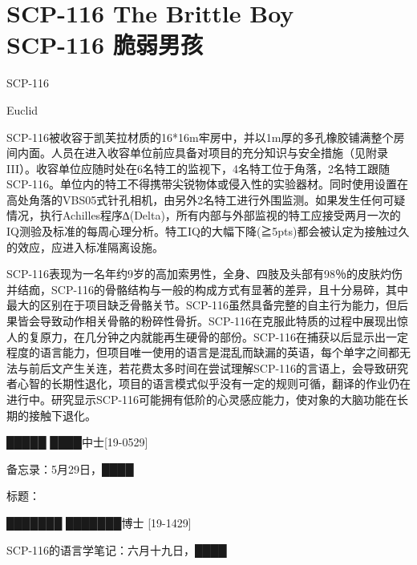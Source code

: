 \chapter[SCP-116 脆弱男孩]{
    SCP-116 The Brittle Boy\\
    SCP-116 脆弱男孩
}

\label{chap:SCP-116}

SCP-116

Euclid

SCP-116被收容于凯芙拉材质的16*16m牢房中，并以1m厚的多孔橡胶铺满整个房间内面。人员在进入收容单位前应具备对项目的充分知识与安全措施（见附录III）。收容单位应随时处在6名特工的监视下，4名特工位于角落，2名特工跟随SCP-116。单位内的特工不得携带尖锐物体或侵入性的实验器材。同时使用设置在高处角落的VBS05式针孔相机，由另外2名特工进行外围监测。如果发生任何可疑情况，执行Achilles程序∆(Delta)，所有内部与外部监视的特工应接受两月一次的IQ测验及标准的每周心理分析。特工IQ的大幅下降(≧5pts)都会被认定为接触过久的效应，应进入标准隔离设施。

SCP-116表现为一名年约9岁的高加索男性，全身、四肢及头部有98％的皮肤灼伤并结痂，SCP-116的骨骼结构与一般的构成方式有显著的差异，且十分易碎，其中最大的区别在于项目缺乏骨骼关节。SCP-116虽然具备完整的自主行为能力，但后果皆会导致动作相关骨骼的粉碎性骨折。SCP-116在克服此特质的过程中展现出惊人的复原力，在几分钟之内就能再生硬骨的部份。SCP-116在捕获以后显示出一定程度的语言能力，但项目唯一使用的语言是混乱而缺漏的英语，每个单字之间都无法与前后文产生关连，若花费太多时间在尝试理解SCP-116的言语上，会导致研究者心智的长期性退化，项目的语言模式似乎没有一定的规则可循，翻译的作业仍在进行中。研究显示SCP-116可能拥有低阶的心灵感应能力，使对象的大脑功能在长期的接触下退化。

\hr


█████ ████中士{[}19-0529]

备忘录：5月29日，████

标题：


\hr


███████ ███████博士 {[}19-1429]

SCP-116的语言学笔记：六月十九日，████


